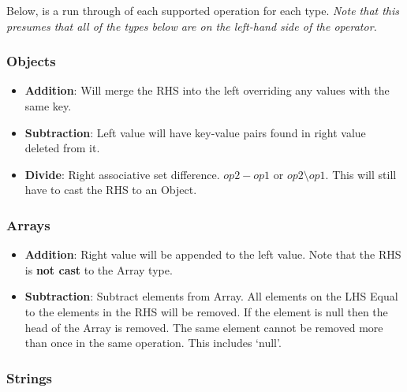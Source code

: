 \documentclass[12pt, letterpaper]{article}
\begin{document}
Below, is a run through of each supported operation for each type. \textit{Note that this presumes that all of the types below are on the left-hand side of the operator.}

\subsubsection{Objects}

\begin{itemize}
    \item \textbf{Addition}: Will merge the RHS into the left overriding any values with the same key.
    \item \textbf{Subtraction}: Left value will have key-value pairs found in right value deleted from it.
    \item \textbf{Divide}: Right associative set difference. $op2 - op1$ or $op2 \setminus op1$. This will still have to cast the RHS to an Object.
\end{itemize}

\subsubsection{Arrays}

\begin{itemize}
    \item \textbf{Addition}: Right value will be appended to the left value. Note that the RHS is \textbf{not cast} to the Array type.
    \item \textbf{Subtraction}: Subtract elements from Array. All elements on the LHS Equal to the elements in the RHS will be removed. If the element is null then the head of the Array is removed. The same element cannot be removed more than once in the same operation. This includes `null'.
\end{itemize}

\subsubsection{Strings}
\end{document}
